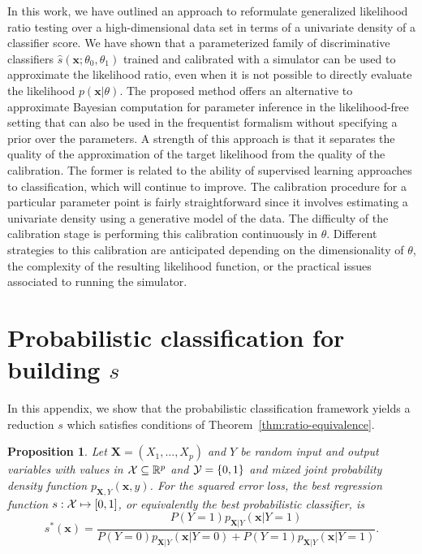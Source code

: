 \documentclass[12pt]{article}
\numberwithin{equation}{section}
\theoremstyle{plain}
\newtheorem{proposition}[theorem]{Proposition}
\begin{document}
In this work, we have outlined an approach to reformulate generalized likelihood
ratio testing over a high-dimensional data set in terms of a univariate density
of a classifier score. We have shown that a parameterized family of
discriminative classifiers $\hat s(\mathbf{x}; \theta_0, \theta_1)$ trained and
calibrated with a simulator can be used to approximate the likelihood ratio,
even when it is not possible to directly evaluate the likelihood
$p(\mathbf{x}|\theta)$.
The proposed method offers an alternative to approximate Bayesian computation
for parameter inference in the likelihood-free setting that can also be used in
the frequentist formalism without specifying a prior over the parameters. A
strength of this approach is that it separates the quality of the approximation
of the target likelihood from the quality of the calibration. The former is
related to the ability of supervised learning approaches to  classification,
which will continue to improve. The calibration procedure for a particular
parameter point is fairly straightforward since it involves estimating a
univariate density using a generative model of the data. The difficulty of the
calibration stage is performing this calibration continuously in $\theta$.
Different strategies to this calibration are anticipated depending on the
dimensionality of $\theta$, the complexity of the resulting likelihood function,
or the practical issues associated to running the simulator.




\appendix

\section{Probabilistic classification for building $s$}
\label{app:clf-for-s}

In this appendix, we show that the probabilistic classification framework
yields a reduction $s$ which satisfies conditions of Theorem~\ref{thm:ratio-equivalence}.

\begin{proposition} \label{thm:best-classifier}
Let $\mathbf{X} = (X_1, ..., X_p)$ and $Y$ be random input and output variables
with values in ${\cal X} \subseteq \mathbb{R}^p$
and ${\cal Y} = \{0, 1\}$ and mixed joint probability density  function
$p_{\mathbf{X},Y}(\mathbf{x}, y)$. For the squared error loss, the best
regression function $s : {\cal X} \mapsto [0, 1]$, or equivalently the best
probabilistic classifier, is
\begin{equation}
s^*(\mathbf{x}) = \frac{P(Y=1) p_{\mathbf{X}|Y}(\mathbf{x}|Y=1)}{P(Y=0) p_{\mathbf{X}|Y}(\mathbf{x} | Y=0) + P(Y=1) p_{\mathbf{X}|Y}(\mathbf{x} | Y=1)}.
\end{equation}
\end{proposition}
\end{document}
